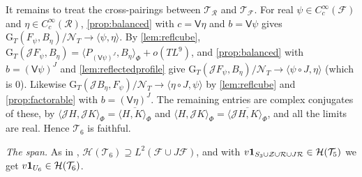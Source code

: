 \documentclass[11pt,colorlinks]{charlie}
\newcommand{\ip}[2]{\langle #1,#2\rangle}
\begin{document}
It remains to treat the cross-pairings between $\mathcal T_{\mathcal R}$ and $\mathcal T_{\mathcal F}$. For real $\psi\in C_c^\infty(\mathcal F)$ and $\eta\in C_c^\infty(\mathcal R)$, \cref{prop:balanced} with $c=\mathsf V\eta$ and $b=\mathsf V\psi$ gives $\mathrm G_T(F_\psi,B_\eta)/\mathcal N_T\to\ip\psi\eta$. By \cref{lem:reflcube}, $\mathrm G_T(\mathcal JF_\psi,B_\eta)=\ip{P_{(\mathsf V\psi)^J}}{B_\eta}_\Phi+o(TL^9)$, and \cref{prop:balanced} with $b=(\mathsf V\psi)^J$ and \cref{lem:reflectedprofile} give $\mathrm G_T(\mathcal JF_\psi,B_\eta)/\mathcal N_T\to\ip{\psi\circ J}\eta$ (which is $0$). Likewise $\mathrm G_T(\mathcal JB_\eta,F_\psi)/\mathcal N_T\to\ip{\eta\circ J}\psi$ by \cref{lem:reflcube} and \cref{prop:factorable} with $b=(\mathsf V\eta)^J$. The remaining entries are complex conjugates of these, by $\ip{\mathcal JH}{\mathcal JK}_\Phi=\overline{\ip HK_\Phi}$ and $\ip H{\mathcal JK}_\Phi=\overline{\ip{\mathcal JH}K_\Phi}$, and all the limits are real. Hence $\mathcal T_6$ is faithful.

\emph{The span.} As in , $\mathcal H(\mathcal T_6)\supseteq L^2(\mathcal F\cup J\mathcal F)$, and with $v\mathbf{1}_{S_3\cup\mathcal Z\cup\mathcal R\cup J\mathcal R}\in\mathcal H(\mathcal T_5)$ we get $v\mathbf{1}_{U_6}\in\mathcal H(\mathcal T_6)$.
\end{document}
